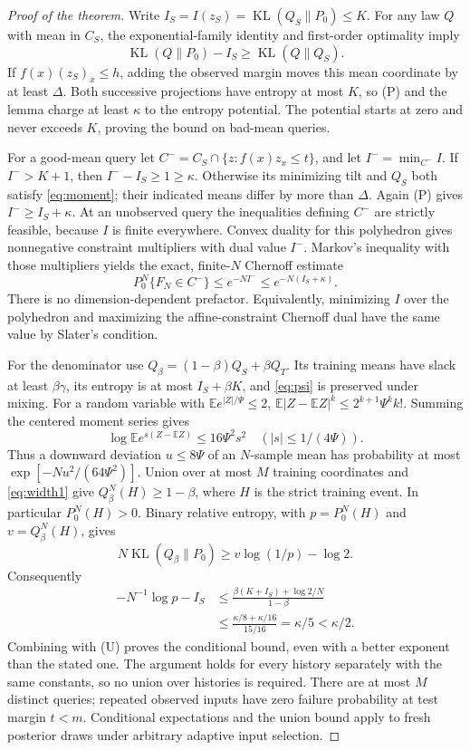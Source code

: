 \documentclass[11pt]{article}
\newcommand{\KL}{\operatorname{KL}}
\newcommand{\E}{\mathbb E}
\begin{document}
\begin{proof}[Proof of the theorem]
Write $I_S=I(z_S)=\KL(Q_S\|P_0)\le K$. For any law $Q$ with mean in
$C_S$, the exponential-family identity and first-order optimality imply
\[
 \KL(Q\|P_0)-I_S\ge\KL(Q\|Q_S).\tag{P}
\]
If $f(x)(z_S)_x\le h$, adding the observed margin moves this mean
coordinate by at least $\Delta$. Both successive projections have
entropy at most $K$, so (P) and the lemma charge at least $\kappa$ to
the entropy potential. The potential starts at zero and never exceeds
$K$, proving the bound on bad-mean queries.

For a good-mean query let
$C^-=C_S\cap\{z:f(x)z_x\le t\}$, and let $I^- =\min_{C^-}I$.
If $I^->K+1$, then $I^--I_S\ge1\ge\kappa$. Otherwise its minimizing
tilt and $Q_S$ both satisfy \eqref{eq:moment}; their indicated means
differ by more than $\Delta$. Again (P) gives
$I^-\ge I_S+\kappa$. At an unobserved query the inequalities defining
$C^-$ are strictly feasible, because $I$ is finite everywhere. Convex
duality for this polyhedron gives nonnegative constraint multipliers
with dual value $I^-$. Markov's inequality with those multipliers yields
the exact, finite-$N$ Chernoff estimate
\[
 P_0^N\{F_N\in C^-\}\le e^{-NI^-}
                        \le e^{-N(I_S+\kappa)}.\tag{U}
\]
There is no dimension-dependent prefactor. Equivalently, minimizing
$I$ over the polyhedron and maximizing the affine-constraint Chernoff
dual have the same value by Slater's condition.

For the denominator use $Q_\beta=(1-\beta)Q_S+\beta Q_T$. Its training
means have slack at least $\beta\gamma$, its entropy is at most
$I_S+\beta K$, and \eqref{eq:psi} is preserved under mixing. For a
random variable with $\E e^{|Z|/\Psi}\le2$,
$\E|Z-\E Z|^k\le2^{k+1}\Psi^k k!$. Summing the centered moment
series gives
\[
 \log\E e^{s(Z-\E Z)}\le16\Psi^2s^2
 \quad (|s|\le1/(4\Psi)).
\]
Thus a downward deviation $u\le8\Psi$ of an $N$-sample mean has
probability at most $\exp[-Nu^2/(64\Psi^2)]$. Union over at most $M$
training coordinates and \eqref{eq:width1} give $Q_\beta^N(H)\ge1-\beta$,
where $H$ is the strict training event. In particular $P_0^N(H)>0$.
Binary relative entropy, with $p=P_0^N(H)$ and $v=Q_\beta^N(H)$, gives
\[
 N\KL(Q_\beta\|P_0)\ge v\log(1/p)-\log2.
\]
Consequently
\begin{align*}
 -N^{-1}\log p-I_S
 &\le\frac{\beta(K+I_S)+\log2/N}{1-\beta}\\
 &\le\frac{\kappa/8+\kappa/16}{15/16}
 =\kappa/5<\kappa/2.
\end{align*}
Combining with (U) proves the conditional bound, even with a better
exponent than the stated one. The argument holds for every history
separately with the same constants, so no union over histories is
required. There are at most $M$ distinct queries; repeated observed
inputs have zero failure probability at test margin $t<m$.
Conditional expectations and the union bound apply to fresh posterior
draws under arbitrary adaptive input selection.
\end{proof}
\end{document}
